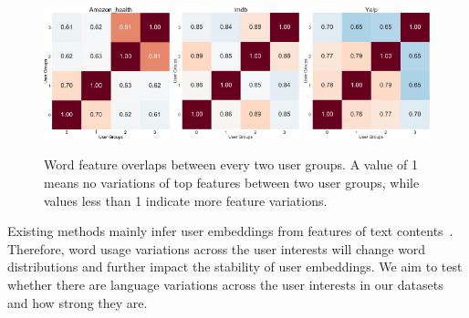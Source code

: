 \begin{figure}[t]
    \centering
    \includegraphics[width=0.325\textwidth]{./images/chapter4/uembedding/amazon_health_word.pdf}
    \includegraphics[width=0.325\textwidth]{./images/chapter4/uembedding/imdb_word.pdf}
    \includegraphics[width=0.325\textwidth]{./images/chapter4/uembedding/yelp_word.pdf}
    \caption{Word feature overlaps between every two user groups. A value of 1 means no variations of top features between two user groups, while values less than 1 indicate more feature variations.}
    \label{chap4:fig:word_user}
\end{figure}


Existing methods mainly infer user embeddings from features of text contents~\cite{pan2019social}.
Therefore, word usage variations across the user interests will change word distributions and further impact the stability of user embeddings.
We aim to test whether there are language variations across the user interests in our datasets and how strong they are.

